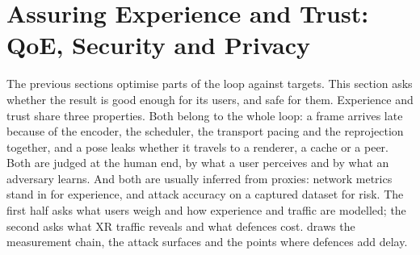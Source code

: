 \section{Assuring Experience and Trust: QoE, Security and Privacy}\label{sec:assure}

The previous sections optimise parts of the loop against targets. This section asks whether the result is
good enough for its users, and safe for them. Experience and trust share three properties. Both belong to
the whole loop: a frame arrives late because of the encoder, the scheduler, the transport pacing and the
reprojection together, and a pose leaks whether it travels to a renderer, a cache or a peer. Both are
judged at the human end, by what a user perceives and by what an adversary learns. And
both are usually inferred from proxies: network metrics stand in for experience, and attack accuracy on a
captured dataset for risk. The first half asks what users weigh and how experience and traffic
are modelled; the second asks what XR traffic reveals and what defences cost. 
draws the measurement chain, the attack surfaces and the points where defences add delay.

